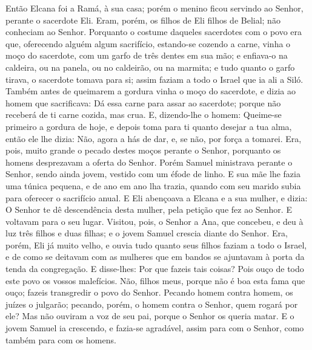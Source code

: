 Então Elcana foi a Ramá, à sua casa; porém o menino ficou
servindo ao Senhor, perante o sacerdote Eli. Eram, porém, os
filhos de Eli filhos de Belial; não conheciam ao Senhor.
Porquanto o costume daqueles sacerdotes com o povo era que,
oferecendo alguém algum sacrifício, estando-se cozendo a carne,
vinha o moço do sacerdote, com um garfo de três dentes em sua mão;
e enfiava-o na caldeira, ou na panela, ou no caldeirão, ou na
marmita; e tudo quanto o garfo tirava, o sacerdote tomava para si;
assim faziam a todo o Israel que ia ali a Siló. Também antes
de queimarem a gordura vinha o moço do sacerdote, e dizia ao homem
que sacrificava: Dá essa carne para assar ao sacerdote; porque não
receberá de ti carne cozida, mas crua. E, dizendo-lhe o
homem: Queime-se primeiro a gordura de hoje, e depois toma para ti
quanto desejar a tua alma, então ele lhe dizia: Não, agora a hás de
dar, e, se não, por força a tomarei. Era, pois, muito grande
o pecado destes moços perante o Senhor, porquanto os homens
desprezavam a oferta do Senhor. Porém Samuel ministrava
perante o Senhor, sendo ainda jovem, vestido com um éfode de linho.
E sua mãe lhe fazia uma túnica pequena, e de ano em ano lha
trazia, quando com seu marido subia para oferecer o sacrifício
anual. E Eli abençoava a Elcana e a sua mulher, e dizia: O
Senhor te dê descendência desta mulher, pela petição que fez ao
Senhor. E voltavam para o seu lugar. Visitou, pois, o Senhor
a Ana, que concebeu, e deu à luz três filhos e duas filhas; e o
jovem Samuel crescia diante do Senhor. Era, porém, Eli já
muito velho, e ouvia tudo quanto seus filhos faziam a todo o Israel,
e de como se deitavam com as mulheres que em bandos se ajuntavam à
porta da tenda da congregação. E disse-lhes: Por que fazeis
tais coisas? Pois ouço de todo este povo os vossos malefícios.
Não, filhos meus, porque não é boa esta fama que ouço; fazeis
transgredir o povo do Senhor. Pecando homem contra homem, os
juízes o julgarão; pecando, porém, o homem contra o Senhor, quem
rogará por ele? Mas não ouviram a voz de seu pai, porque o Senhor os
queria matar. E o jovem Samuel ia crescendo, e fazia-se
agradável, assim para com o Senhor, como também para com os homens.

